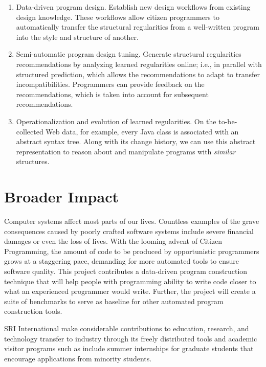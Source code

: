 \begin{enumerate}
	\item Data-driven program design. Establish new design workflows 
	from existing design knowledge. These workflows allow citizen 
	programmers to automatically transfer the structural regularities 
	from a well-written program into the style and structure of another.  
	\item Semi-automatic program design tuning. Generate structural 
	regularities recommendations by analyzing learned regularities online; 
	i.e., in parallel with structured prediction, which allows the 
	recommendations to adapt to transfer incompatibilities. Programmers 
	can provide feedback on the recommendations, which is taken into 
	account for subsequent recommendations.	
	\item Operationalization and evolution of learned regularities. 
	On the to-be-collected Web data, for example, every Java class is associated 
	with an abstract syntax tree. Along with its change history, we can use 
	this abstract representation to reason about and manipulate programs 
	with \textit{similar} structures.
\end{enumerate}

\section*{Broader Impact} %
\label{sec:impact}

Computer systems affect most parts of our lives. Countless examples of 
the grave consequences caused by poorly crafted software systems include 
severe financial damages or even the loss of lives. With the looming 
advent of Citizen Programming, the amount of code to be produced by 
opportunistic programmers grows at a staggering pace, demanding for more 
automated tools to ensure software quality. This project contributes a 
data-driven program construction technique that will help people with 
programming ability to write code closer to what an experienced programmer 
would write. Further, the project will create a suite of benchmarks to 
serve as baseline for other automated program construction tools.

SRI International make considerable contributions to education, research, 
and technology transfer to industry through its freely distributed tools 
and academic visitor programs such as include summer internships for graduate 
students that encourage applications from minority students.